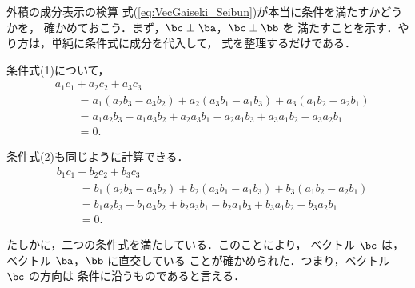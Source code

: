             \begin{mysmallsec}{外積の成分表示の検算}
                式(\ref{eq:VecGaiseki_Seibun})が本当に条件を満たすかどうかを，
                確かめておこう．まず，$\bc \perp \ba$，$\bc \perp \bb$ を
                満たすことを示す．やり方は，単純に条件式に成分を代入して，
                式を整理するだけである．

                条件式(1)について，
                    \begin{align*}
                         &a_{1}c_{1} + a_{2}c_{2} + a_{3}c_{3} \\
                         &\qquad=   a_{1}(a_{2}b_{3} - a_{3}b_{2})
                             + a_{2}(a_{3}b_{1} - a_{1}b_{3}) + a_{3}(a_{1}b_{2} - a_{2}b_{1}) \\
                         &\qquad=   a_{1}a_{2}b_{3} - a_{1}a_{3}b_{2}
                             + a_{2}a_{3}b_{1} - a_{2}a_{1}b_{3} + a_{3}a_{1}b_{2} - a_{3}a_{2}b_{1} \\
                         &\qquad= 0.
                    \end{align*}

                条件式(2)も同じように計算できる．
                    \begin{align*}
                         &b_{1}c_{1} + b_{2}c_{2} + b_{3}c_{3} \\
                         &\qquad=   b_{1}(a_{2}b_{3} - a_{3}b_{2})
                             + b_{2}(a_{3}b_{1} - a_{1}b_{3}) + b_{3}(a_{1}b_{2} - a_{2}b_{1}) \\
                         &\qquad=   b_{1}a_{2}b_{3} - b_{1}a_{3}b_{2}
                             + b_{2}a_{3}b_{1} - b_{2}a_{1}b_{3} + b_{3}a_{1}b_{2} - b_{3}a_{2}b_{1} \\
                         &\qquad= 0.
                    \end{align*}

                たしかに，二つの条件式を満たしている．このことにより，
                ベクトル $\bc$ は，ベクトル $\ba$，$\bb$ に直交している
                ことが確かめられた．つまり，ベクトル $\bc$ の方向は
                条件に沿うものであると言える．


\end{mysmallsec}
